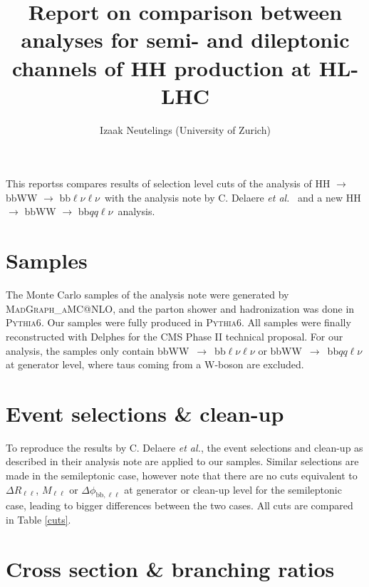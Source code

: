 \documentclass[10pt,a4paper]{article}
\title{Report on comparison between analyses for semi- and dileptonic channels of HH production at HL-LHC}
\author{Izaak Neutelings (University of Zurich)}
\newcommand{\di}{$\rightarrow$ bbWW $\rightarrow$ bb$\ell\nu \ell\nu$}
\newcommand{\semi}{$\rightarrow$ bbWW $\rightarrow$ bb$qq\ell\nu$}
\newcommand{\lnu}{$\ell\nu$}
\renewcommand{\ll}{\ell\ell}
\newcommand{\etal}{\emph{et al.}}
\begin{document}
\maketitle





This reportss compares results of selection level cuts of the analysis of HH \di\ with the analysis note by C. Delaere \etal\ \cite{AN} and a new HH \semi\ analysis.





\section{Samples}

The Monte Carlo samples of the analysis note were generated by \textsc{MadGraph\_aMC@NLO}, and the parton shower and hadronization was done in \textsc{Pythia6}. Our samples were fully produced in \textsc{Pythia6}. All samples were finally reconstructed with Delphes for the CMS Phase II technical proposal.
For our analysis, the samples only contain \mbox{bbWW $\rightarrow$ bb\lnu\lnu} or \mbox{bbWW $\rightarrow$ bb$qq$\lnu} at generator level, where taus coming from a W-boson are excluded. %





\section{Event selections \& clean-up}

To reproduce the results by C. Delaere \etal, the event selections and clean-up as described in their analysis note are applied to our samples. %
Similar selections are made in the semileptonic case, however note that there are no cuts equivalent to $\Delta R_{\ll}$, $M_{\ll}$ or $\Delta \phi_{\text{bb},\ll}$ at generator or clean-up level for the semileptonic case, leading to bigger differences between the two cases. All cuts are compared in Table \ref{cuts}.





\section{Cross section \& branching ratios}
\end{document}
